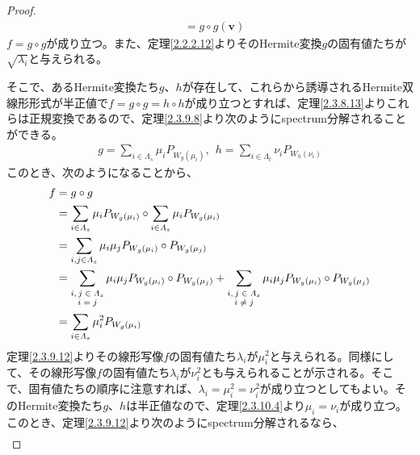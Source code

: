 \documentclass[dvipdfmx]{jsarticle}
\begin{document}
\begin{proof}
\begin{align*}
&= g \circ g\left( \mathbf{v} \right)
\end{align*}
$f = g \circ g$が成り立つ。また、定理\ref{2.2.2.12}よりそのHermite変換$g$の固有値たちが$\sqrt{\lambda_{i}}$と与えられる。\par
そこで、あるHermite変換たち$g$、$h$が存在して、これらから誘導されるHermite双線形形式が半正値で$f = g \circ g = h \circ h$が成り立つとすれば、定理\ref{2.3.8.13}よりこれらは正規変換であるので、定理\ref{2.3.9.8}より次のようにspectrum分解されることができる。
\begin{align*}
g = \sum_{i \in \varLambda_{s}} {\mu_{i}P_{W_{g}\left( \mu_{i} \right)}},\ \ h = \sum_{i \in \varLambda_{t}} {\nu_{i}P_{W_{h}\left( \nu_{i} \right)}}
\end{align*}
このとき、次のようになることから、
\begin{align*}
f &= g \circ g\\
&= \sum_{i \in \varLambda_{s}} {\mu_{i}P_{W_{g}\left( \mu_{i} \right)}} \circ \sum_{i \in \varLambda_{s}} {\mu_{i}P_{W_{g}\left( \mu_{i} \right)}}\\
&= \sum_{i,j \in \varLambda_{s}} {\mu_{i}\mu_{j}P_{W_{g}\left( \mu_{i} \right)} \circ P_{W_{g}\left( \mu_{j} \right)}}\\
&= \sum_{\scriptsize \begin{matrix} i,j \in \varLambda_{s} \\i = j \\\end{matrix}} {\mu_{i}\mu_{j}P_{W_{g}\left( \mu_{i} \right)} \circ P_{W_{g}\left( \mu_{j} \right)}} + \sum_{\scriptsize \begin{matrix} i,j \in \varLambda_{s} \\i \neq j \\\end{matrix}} {\mu_{i}\mu_{j}P_{W_{g}\left( \mu_{i} \right)} \circ P_{W_{g}\left( \mu_{j} \right)}}\\
&= \sum_{i \in \varLambda_{s} } {\mu_{i}^{2}P_{W_{g}\left( \mu_{i} \right)}}
\end{align*}
定理\ref{2.3.9.12}よりその線形写像$f$の固有値たち$\lambda_{i}$が$\mu_{i}^{2}$と与えられる。同様にして、その線形写像$f$の固有値たち$\lambda_{i}$が$\nu_{i}^{2}$とも与えられることが示される。そこで、固有値たちの順序に注意すれば、$\lambda_{i} = \mu_{i}^{2} = \nu_{i}^{2}$が成り立つとしてもよい。そのHermite変換たち$g$、$h$は半正値なので、定理\ref{2.3.10.4}より$\mu_{i} = \nu_{i}$が成り立つ。このとき、定理\ref{2.3.9.12}より次のようにspectrum分解されるなら、
\begin{align*}

\end{align*}
\end{proof}
\end{document}
